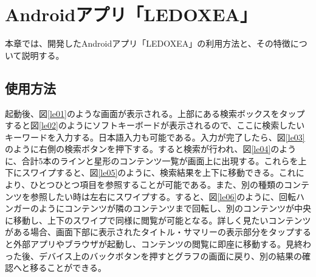 \chapter{Androidアプリ「LEDOXEA」}
\label{chap:ledoxea}

本章では、開発したAndroidアプリ「LEDOXEA」の利用方法と、その特徴について説明する。

\section{使用方法}
起動後、図\ref{le01}のような画面が表示される。上部にある検索ボックスをタップすると図\ref{le02}のようにソフトキーボードが表示されるので、ここに検索したいキーワードを入力する。日本語入力も可能である。入力が完了したら、図\ref{le03}のように右側の検索ボタンを押下する。すると検索が行われ、図\ref{le04}のように、合計5本のラインと星形のコンテンツ一覧が画面上に出現する。これらを上下にスワイプすると、図\ref{le05}のように、検索結果を上下に移動できる。これにより、ひとつひとつ項目を参照することが可能である。また、別の種類のコンテンツを参照したい時は左右にスワイプする。すると、図\ref{le06}のように、回転ハンガーのようにコンテンツが隣のコンテンツまで回転し、別のコンテンツが中央に移動し、上下のスワイプで同様に閲覧が可能となる。詳しく見たいコンテンツがある場合、画面下部に表示されたタイトル・サマリーの表示部分をタップすると外部アプリやブラウザが起動し、コンテンツの閲覧に即座に移動する。見終わった後、デバイス上のバックボタンを押すとグラフの画面に戻り、別の結果の確認へと移ることができる。

